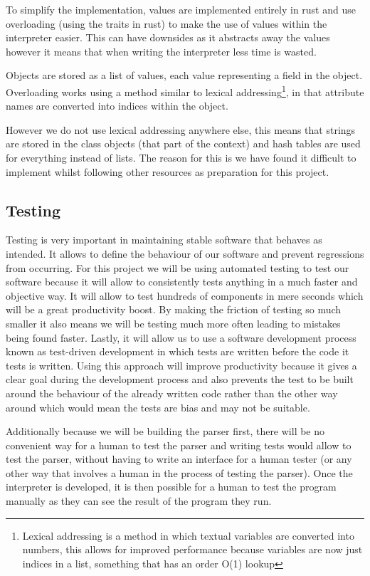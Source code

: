 \documentclass{article}
\begin{document}
To simplify the implementation, values are implemented entirely in rust and use
overloading (using the traits in rust) to make the use of values within the
interpreter easier. This can have downsides as it abstracts away the values
however it means that when writing the interpreter less time is wasted.

Objects are stored as a list of values, each value representing a field in the
object. Overloading works using a method similar to lexical
addressing\footnote{Lexical addressing is a method in which textual variables
are converted into numbers, this allows for improved performance because
variables are now just indices in a list, something that has an order O(1)
lookup}, in that attribute names are converted into indices within the object.

However we do not use lexical addressing anywhere else, this means that strings
are stored in the class objects (that part of the context) and hash tables are
used for everything instead of lists. The reason for this is we have found it
difficult to implement whilst following other resources as preparation for this
project.

\subsection{Testing}

Testing is very important in maintaining stable software that behaves as
intended. It allows to define the behaviour of our software and prevent
regressions from occurring. For this project we will be using automated testing
to test our software because it will allow to consistently tests anything in a
much faster and objective way. It will allow to test hundreds of components in
mere seconds which will be a great productivity boost. By making the friction
of testing so much smaller it also means we will be testing much more often
leading to mistakes being found faster. Lastly, it will allow us to use a
software development process known as test-driven development in which tests
are written before the code it tests is written. Using this approach will
improve productivity because it gives a clear goal during the development
process and also prevents the test to be built around the behaviour of the
already written code rather than the other way around which would mean the
tests are bias and may not be suitable.

Additionally because we will be building the parser first, there will be no
convenient way for a human to test the parser and writing tests would allow to
test the parser, without having to write an interface for a human tester (or
any other way that involves a human in the process of testing the parser). Once
the interpreter is developed, it is then possible for a human to test the
program manually as they can see the result of the program they run.
\end{document}
